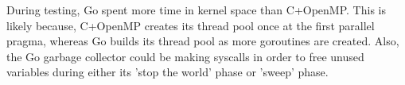 \documentclass[11pt,a4paper,titlepage]{article}
\begin{document}
During testing, Go spent more time in kernel space than C+OpenMP.
This is likely because, C+OpenMP creates its thread pool once at the first parallel pragma, whereas Go builds its thread pool as more goroutines are created.
Also, the Go garbage collector could be making syscalls in order to free unused variables during either its 'stop the world' phase or 'sweep' phase.
\end{document}
